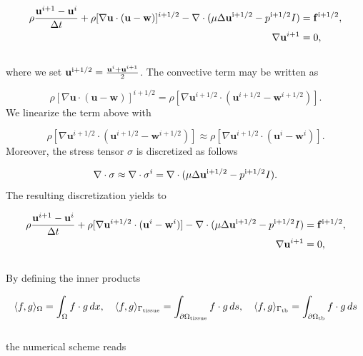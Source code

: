 \documentclass[11pt,a4paper,titlepage]{report}
\begin{document}
\begin{align}
\rho \frac{\mathbf{u}^{i+1} - \mathbf{u}^i}{\Delta t} + \rho [\nabla \mathbf{u} \cdot (\mathbf{u} - \mathbf{w})]^{i+1/2} - \nabla \cdot (\mu \Delta \mathbf{u}^{\rm  i+1/2} - p^{\rm i+1/2}I) &= \mathbf{f}^{\rm i+1/2}, \\
\nabla \mathbf{u}^{i+1} &= 0,
\end{align}
\\
where we set $\mathbf{u}^{\rm i+1/2} = \frac{\mathbf{u}^i + \mathbf{u}^{i+1}}{2}$.
The convective term may be written as

\begin{equation}
\rho [\nabla \mathbf{u} \cdot (\mathbf{u} - \mathbf{w})]^{i+1/2} = \rho [\nabla \mathbf{u}^{i+1/2} \cdot (\mathbf{u}^{i+1/2} - \mathbf{w}^{i+1/2})].
\end{equation}
We linearize the term above with

\begin{equation}
\rho [\nabla \mathbf{u}^{i+1/2} \cdot (\mathbf{u}^{i+1/2} - \mathbf{w}^{i+1/2})] \approx \rho [\nabla \mathbf{u}^{i+1/2} \cdot (\mathbf{u}^i - \mathbf{w}^i)].
\end{equation}
Moreover, the stress tensor $\sigma$ is discretized as follows 

\begin{equation}
\nabla \cdot \sigma \approx \nabla \cdot \sigma^i = \nabla \cdot (\mu \Delta \mathbf{u}^{\rm i+1/2} - p^{\rm i+1/2} I).
\end{equation}
The resulting discretization yields to

\begin{align}
\rho \frac{\mathbf{u}^{i+1} - \mathbf{u}^i}{\Delta t} + \rho [\nabla \mathbf{u}^{i+1/2} \cdot (\mathbf{u}^i - \mathbf{w}^i)] - \nabla \cdot (\mu \Delta \mathbf{u}^{\rm  i+1/2} - p^{\rm i+1/2}I) &= \mathbf{f}^{\rm i+1/2}, \\
\nabla \mathbf{u}^{i+1} &= 0,
\end{align}
\\
By defining the inner products

\[
\langle f, g \rangle_\Omega = \int_\Omega f \cdot g \, dx, \quad
\langle f, g \rangle_{\Gamma_{\rm tissue}} = \int_{\partial \Omega_{\rm tissue}} f \cdot g \, ds, \quad
\langle f, g \rangle_{\Gamma_{\rm tb}} = \int_{\partial \Omega_{\rm tb}} f \cdot g \, ds
\]
\\
the numerical scheme reads
\end{document}
